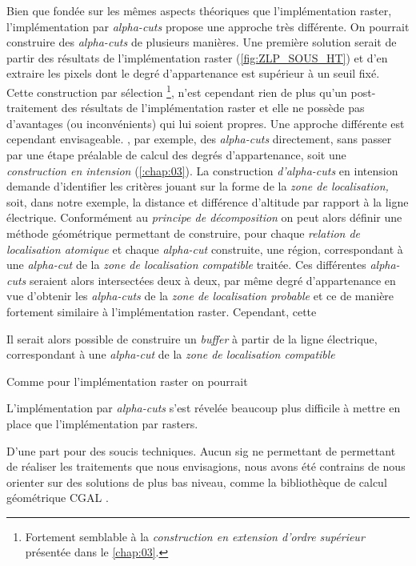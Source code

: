 Bien que fondée sur les mêmes aspects théoriques que l'implémentation raster, l'implémentation par \emph{alpha-cuts} propose une approche très différente. On pourrait construire des \emph{alpha-cuts} de plusieurs manières. Une première solution serait de partir des résultats de l'implémentation raster (\autoref{fig:ZLP_SOUS_HT}) et d'en extraire les pixels dont le degré d'appartenance est supérieur à un seuil fixé. Cette construction par sélection \footnote{Fortement semblable à la \emph{construction en extension d'ordre supérieur} présentée dans le \autoref{chap:03}.}, n'est cependant rien de plus qu'un post-traitement des résultats de l'implémentation raster et elle ne possède pas d'avantages (ou inconvénients) qui lui soient propres. Une approche différente est cependant envisageable. \textcite{Runz2008a, Zoghlami2016}, par exemple, des \emph{alpha-cuts} directement, sans passer par une étape préalable de calcul des degrés d'appartenance, soit une \emph{construction en intension} (\autoref{:chap:03}). La construction \emph{d'alpha-cuts} en intension demande d'identifier les critères jouant sur la forme de la \emph{zone de localisation,} soit, dans notre exemple, la distance et différence d'altitude par rapport à la ligne électrique. Conformément au \emph{principe de décomposition} on peut alors définir une méthode géométrique permettant de construire, pour chaque \emph{relation de localisation atomique} et chaque \emph{alpha-cut} construite, une région, correspondant à une \emph{alpha-cut} de la \emph{zone de localisation compatible} traitée. Ces différentes \emph{alpha-cuts} seraient alors intersectées deux à deux, par même degré d'appartenance en vue d'obtenir les \emph{alpha-cuts} de la \emph{zone de localisation probable} et ce de manière fortement similaire à l'implémentation raster. Cependant, cette 

Il serait alors possible de construire un \emph{buffer} à partir de la ligne électrique, correspondant à une \emph{alpha-cut} de la \emph{zone de localisation compatible}

Comme pour l'implémentation raster on pourrait 


L'implémentation par \emph{alpha-cuts} s'est révelée beaucoup plus
difficile à mettre en place que l'implémentation par rasters.


D'une part pour des soucis techniques. Aucun \ac{sig} ne permettant de
permettant de réaliser les traitements que nous envisagions, nous
avons été contrains de nous orienter sur des solutions de plus bas
niveau, comme la bibliothèque de calcul géométrique CGAL
\autocite{CGAL2019}.

